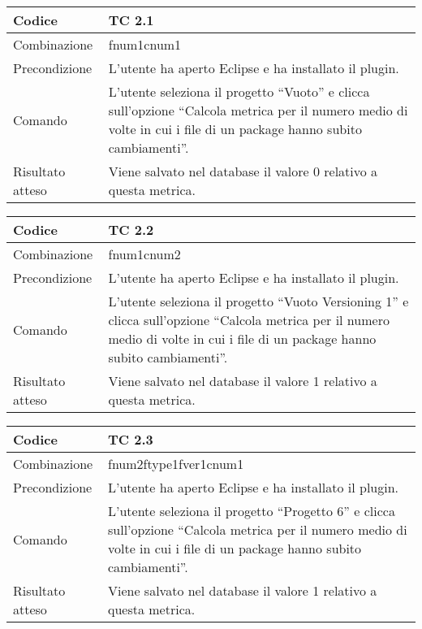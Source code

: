 \begin{table}[ht]
\begin{tabular}{|p{3cm}|p{9cm}|}
\hline
\cellcolor{lightgray}Codice				& TC 2.1								\\
\hline
\cellcolor{lightgray}Combinazione		& fnum1cnum1								\\
\hline
\cellcolor{lightgray}Precondizione		& L'utente ha aperto Eclipse e ha installato il plugin.		\\
\hline
\cellcolor{lightgray}Comando			& L'utente seleziona il progetto ``Vuoto''  e clicca sull'opzione ``Calcola metrica per il numero medio di volte in cui i file di un package hanno subito cambiamenti''.	\\
\hline
\cellcolor{lightgray}Risultato atteso	& Viene salvato nel database il valore 0 relativo a questa metrica.\\
\hline
\end{tabular}
\end{table}

\begin{table}[ht]
\begin{tabular}{|p{3cm}|p{9cm}|}
\hline
\cellcolor{lightgray}Codice				& TC 2.2								\\
\hline
\cellcolor{lightgray}Combinazione		& fnum1cnum2								\\
\hline
\cellcolor{lightgray}Precondizione		& L'utente ha aperto Eclipse e ha installato il plugin.		\\
\hline
\cellcolor{lightgray}Comando			& L'utente seleziona il progetto ``Vuoto Versioning 1''  e clicca sull'opzione ``Calcola metrica per il numero medio di volte in cui i file di un package hanno subito cambiamenti''.	\\
\hline
\cellcolor{lightgray}Risultato atteso	& Viene salvato nel database il valore 1 relativo a questa metrica.\\
\hline
\end{tabular}
\end{table}

\begin{table}[ht]
\begin{tabular}{|p{3cm}|p{9cm}|}
\hline
\cellcolor{lightgray}Codice				& TC 2.3								\\
\hline
\cellcolor{lightgray}Combinazione		& fnum2ftype1fver1cnum1									\\
\hline
\cellcolor{lightgray}Precondizione		& L'utente ha aperto Eclipse e ha installato il plugin.		\\
\hline
\cellcolor{lightgray}Comando			& L'utente seleziona il progetto ``Progetto 6''  e clicca sull'opzione ``Calcola metrica per il numero medio di volte in cui i file di un package hanno subito cambiamenti''.	\\
\hline
\cellcolor{lightgray}Risultato atteso	& Viene salvato nel database il valore 1 relativo a questa metrica.\\
\hline
\end{tabular}
\end{table}

